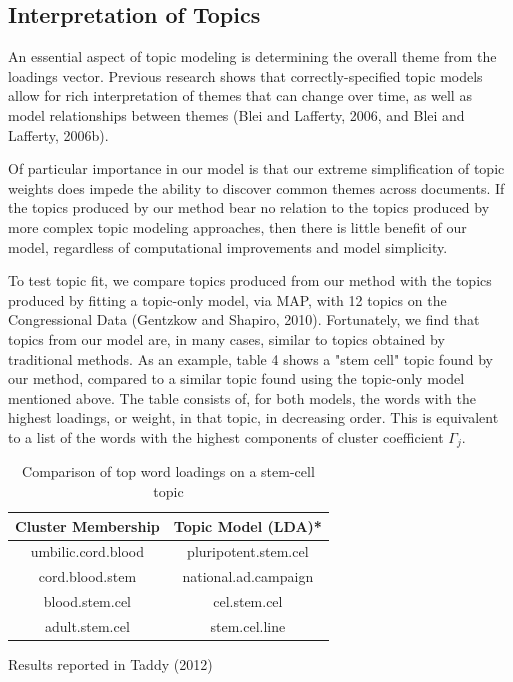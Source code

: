 \documentclass[12pt]{article}
\begin{document}


\subsection{Interpretation of Topics}

An essential aspect of topic modeling is determining the overall theme from the loadings vector. Previous research shows that correctly-specified topic models allow for rich interpretation of themes that can change over time, as well as model relationships between themes (Blei and Lafferty, 2006, and Blei and Lafferty, 2006b). 

Of particular importance in our model is that our extreme simplification of topic weights does impede the ability to discover common themes across documents.
If the topics produced by our method bear no relation to the topics produced by more complex topic modeling approaches, then there is little benefit of our model, regardless of computational improvements and model simplicity. 

To test topic fit, we compare topics produced from our method with the topics produced by fitting a topic-only model, via MAP, with 12 topics on the Congressional Data (Gentzkow and Shapiro, 2010). Fortunately, we find that topics from our model are, in many cases, similar to topics obtained by traditional methods. As an example, table 4 shows a "stem cell" topic found by our method, compared to a similar topic found using the topic-only model mentioned above. The table consists of, for both models, the words with the highest loadings, or weight, in that topic, in decreasing order. This is equivalent to a list of the words with the highest components of cluster coefficient $\Gamma_j$.

\begin{table}[!htbp]
\begin{threeparttable}
\caption{Comparison of top word loadings on a stem-cell topic} \label{tab:title}
\centering
\begin{tabular}{  c  c }
Cluster Membership & Topic Model (LDA)* \\
\hline
umbilic.cord.blood & pluripotent.stem.cel \\
cord.blood.stem  & national.ad.campaign \\
blood.stem.cel   & cel.stem.cel \\
adult.stem.cel & stem.cel.line \\
\end{tabular}
\begin{tablenotes}
\small
\item  *Results reported in Taddy (2012)
\end{tablenotes}
\end{threeparttable}
\end{table}
\end{document}
